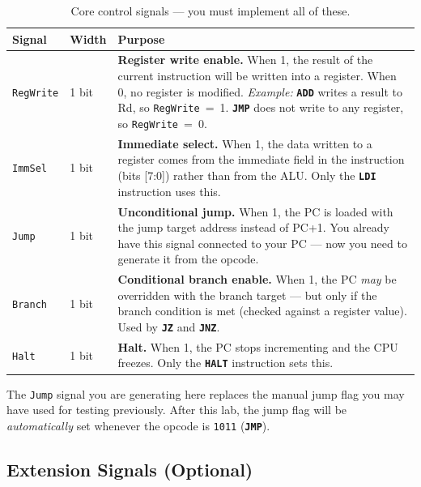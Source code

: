 \documentclass[11pt,a4paper]{article}
\newcommand{\opcode}[1]{\texttt{#1}}
\newcommand{\instr}[1]{\texttt{\textbf{#1}}}
\newcommand{\flag}[1]{\texttt{#1}}
\begin{document}
\renewcommand{\arraystretch}{1.4}
\begin{table}[H]
\centering
\begin{tabularx}{\textwidth}{l l X}
\toprule
\textbf{Signal} & \textbf{Width} & \textbf{Purpose} \\
\midrule
\flag{RegWrite} & 1 bit &
  \textbf{Register write enable.}
  When 1, the result of the current instruction will be written into a register.
  When 0, no register is modified.
  \emph{Example:} \instr{ADD} writes a result to Rd, so \flag{RegWrite}~=~1.
  \instr{JMP} does not write to any register, so \flag{RegWrite}~=~0. \\

\flag{ImmSel} & 1 bit &
  \textbf{Immediate select.}
  When 1, the data written to a register comes from the immediate field in the instruction (bits [7:0]) rather than from the ALU.
  Only the \instr{LDI} instruction uses this. \\

\flag{Jump} & 1 bit &
  \textbf{Unconditional jump.}
  When 1, the PC is loaded with the jump target address instead of PC+1.
  You already have this signal connected to your PC --- now you need to generate it from the opcode. \\

\flag{Branch} & 1 bit &
  \textbf{Conditional branch enable.}
  When 1, the PC \emph{may} be overridden with the branch target --- but only if the branch condition is met (checked against a register value).
  Used by \instr{JZ} and \instr{JNZ}. \\

\flag{Halt} & 1 bit &
  \textbf{Halt.}
  When 1, the PC stops incrementing and the CPU freezes.
  Only the \instr{HALT} instruction sets this. \\

\bottomrule
\end{tabularx}
\caption{Core control signals --- you must implement all of these.}
\end{table}

\begin{warningbox}
The \flag{Jump} signal you are generating here replaces the manual jump flag you may have used for testing previously.
After this lab, the jump flag will be \emph{automatically} set whenever the opcode is \opcode{1011} (\instr{JMP}).
\end{warningbox}

\subsection{Extension Signals (Optional)}
\end{document}
